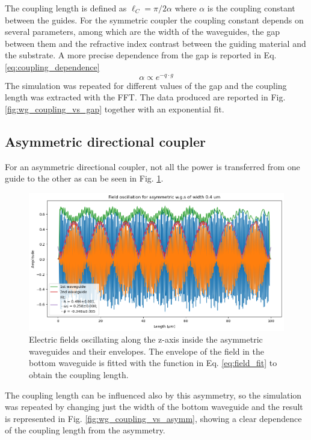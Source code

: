 The coupling length is defined as $\ell_C = \pi / 2\alpha$ where $\alpha$ is the coupling constant between the guides. For the symmetric coupler the coupling constant depends on several parameters\cite{photonics_book}, among which are the width of the waveguides, the gap between them and the refractive index contrast between the guiding material and the substrate. A more precise dependence from the gap is reported in Eq. \ref{eq:coupling_dependence}
\begin{equation} \label{eq:coupling_dependence}
    \alpha \propto e^{-q\cdot g} 
\end{equation}
The simulation was repeated for different values of the gap and the coupling length was extracted with the FFT. The data produced are reported in Fig. \ref{fig:wg_coupling_vs_gap} together with an exponential fit.
        
\subsection{Asymmetric directional coupler}

For an asymmetric directional coupler, not all the power is transferred from one guide to the other as can be seen in Fig. \ref{fig:wg_field_asymm}.

\begin{figure}[H]
    \centering
    \includegraphics[width=0.8\linewidth]{Figures/wg_field_asymm.png}
    \caption{Electric ﬁelds oscillating along the z-axis inside the asymmetric waveguides and their envelopes. The envelope of the field in the bottom waveguide is ﬁtted with the function in Eq. \ref{eq:field_fit} to obtain the coupling length.}
    \label{fig:wg_field_asymm}
\end{figure}

The coupling length can be influenced also by this asymmetry, so the simulation was repeated by changing just the width of the bottom waveguide and the result is represented in Fig. \ref{fig:wg_coupling_vs_asymm}, showing a clear dependence of the coupling length from the asymmetry.

